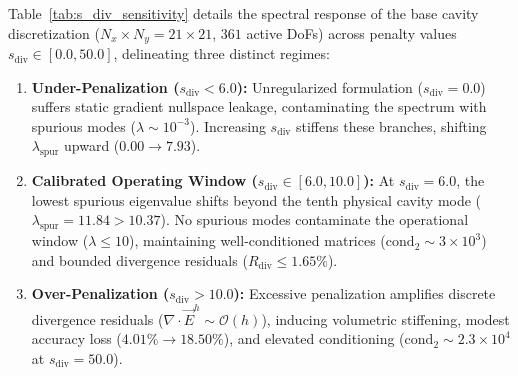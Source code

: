 \documentclass[preprint,12pt]{elsarticle}
\begin{document}
Table~\ref{tab:s_div_sensitivity} details the spectral response of the base cavity discretization ($N_x \times N_y = 21 \times 21$, $361$ active DoFs) across penalty values $s_{\mathrm{div}} \in [0.0, 50.0]$, delineating three distinct regimes:
\begin{enumerate}
    \item \textbf{Under-Penalization ($s_{\mathrm{div}} < 6.0$):} Unregularized formulation ($s_{\mathrm{div}} = 0.0$) suffers static gradient nullspace leakage, contaminating the spectrum with spurious modes ($\lambda \sim 10^{-3}$). Increasing $s_{\mathrm{div}}$ stiffens these branches, shifting $\lambda_{\mathrm{spur}}$ upward ($0.00 \to 7.93$).
    \item \textbf{Calibrated Operating Window ($s_{\mathrm{div}} \in [6.0, 10.0]$):} At $s_{\mathrm{div}} = 6.0$, the lowest spurious eigenvalue shifts beyond the tenth physical cavity mode ($\lambda_{\mathrm{spur}} = 11.84 > 10.37$). No spurious modes contaminate the operational window ($\lambda \le 10$), maintaining well-conditioned matrices ($\mathrm{cond}_2 \sim 3 \times 10^3$) and bounded divergence residuals ($R_{\mathrm{div}} \le 1.65\%$).
    \item \textbf{Over-Penalization ($s_{\mathrm{div}} > 10.0$):} Excessive penalization amplifies discrete divergence residuals ($\nabla \cdot \vec{E}^h \sim \mathcal{O}(h)$), inducing volumetric stiffening, modest accuracy loss ($4.01\% \to 18.50\%$), and elevated conditioning ($\mathrm{cond}_2 \sim 2.3 \times 10^4$ at $s_{\mathrm{div}} = 50.0$).
\end{enumerate}
\end{document}
